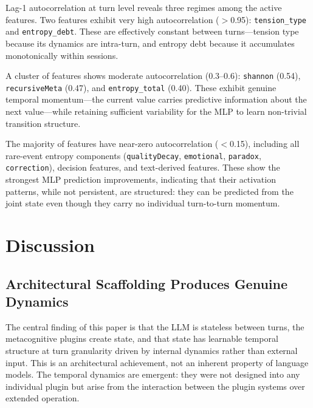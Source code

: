 \documentclass[twoside,11pt]{article}
\begin{document}
Lag-1 autocorrelation at turn level reveals three regimes among the active
features. Two features exhibit very high autocorrelation ($>$0.95):
\texttt{tension\_type} and \texttt{entropy\_debt}. These are effectively
constant between turns---tension type because its dynamics are intra-turn, and
entropy debt because it accumulates monotonically within sessions.

A cluster of features shows moderate autocorrelation (0.3--0.6):
\texttt{shannon} (0.54), \texttt{recursiveMeta} (0.47), and
\texttt{entropy\_total} (0.40). These exhibit genuine temporal momentum---the
current value carries predictive information about the next value---while
retaining sufficient variability for the MLP to learn non-trivial transition
structure.

The majority of features have near-zero autocorrelation ($<$0.15), including
all rare-event entropy components (\texttt{qualityDecay}, \texttt{emotional},
\texttt{paradox}, \texttt{correction}), decision features, and text-derived
features. These show the strongest MLP prediction improvements, indicating that
their activation patterns, while not persistent, are structured: they can be
predicted from the joint state even though they carry no individual turn-to-turn
momentum.


\section{Discussion}
\label{sec:discussion}

\subsection{Architectural Scaffolding Produces Genuine Dynamics}
\label{sec:discuss-scaffolding}

The central finding of this paper is that the LLM is stateless between turns,
the metacognitive plugins create state, and that state has learnable temporal
structure at turn granularity driven by internal dynamics rather than external
input. This is an architectural achievement, not an inherent property of
language models. The temporal dynamics are emergent: they were not designed into
any individual plugin but arise from the interaction between the plugin systems
over extended operation.
\end{document}

